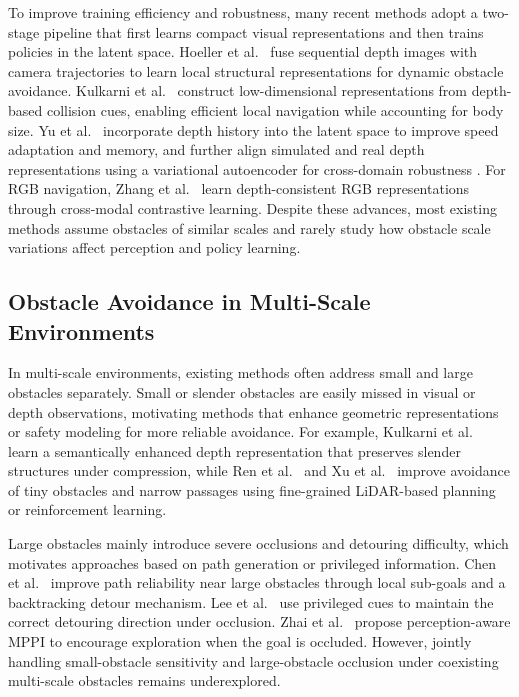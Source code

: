\documentclass[letterpaper, 10 pt, conference]{ieeeconf}  %
\begin{document}
To improve training efficiency and robustness, many recent methods adopt a two-stage pipeline that first learns compact visual representations and then trains policies in the latent space. 
Hoeller et al.~\cite{hoeller2021learning} fuse sequential depth images with camera trajectories to learn local structural representations for dynamic obstacle avoidance.
Kulkarni et al.~\cite{kulkarni2024reinforcement} construct low-dimensional representations from depth-based collision cues, enabling efficient local navigation while accounting for body size.
Yu et al.~\cite{yu2024mavrl} incorporate depth history into the latent space to improve speed adaptation and memory, and further align simulated and real depth representations using a variational autoencoder for cross-domain robustness \cite{yu2025depth}.
For RGB navigation, Zhang et al.~\cite{zhang2025learning} learn depth-consistent RGB representations through cross-modal contrastive learning. 
Despite these advances, most existing methods assume obstacles of similar scales and rarely study how obstacle scale variations affect perception and policy learning.

\subsection{Obstacle Avoidance in Multi-Scale Environments}
In multi-scale environments, existing methods often address small and large obstacles separately. 
Small or slender obstacles are easily missed in visual or depth observations, motivating methods that enhance geometric representations or safety modeling for more reliable avoidance. 
For example, Kulkarni et al.~\cite{kulkarni2023semantically} learn a semantically enhanced depth representation that preserves slender structures under compression,
while Ren et al.~\cite{ren2025safety} and Xu et al.~\cite{xu2025flying} improve avoidance of tiny obstacles and narrow passages using fine-grained LiDAR-based planning or reinforcement learning.

Large obstacles mainly introduce severe occlusions and detouring difficulty, which motivates approaches based on path generation or privileged information. 
Chen et al.~\cite{chen2025general} improve path reliability near large obstacles through local sub-goals and a backtracking detour mechanism.
Lee et al.~\cite{lee2025quadrotor} use privileged cues to maintain the correct detouring direction under occlusion.
Zhai et al.~\cite{zhai2025pa} propose perception-aware MPPI to encourage exploration when the goal is occluded. 
However, jointly handling small-obstacle sensitivity and large-obstacle occlusion under coexisting multi-scale obstacles remains underexplored.
\end{document}
